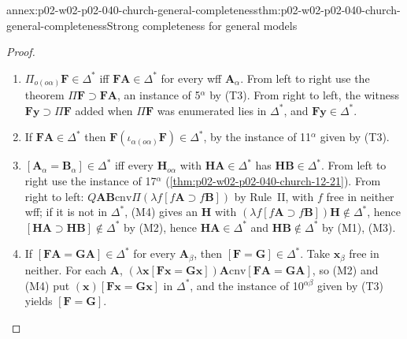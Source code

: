 \begin{annexitem}{annex:p02-w02-p02-040-church-general-completeness}{thm:p02-w02-p02-040-church-general-completeness}{Strong completeness for general models}
\begin{proof}
\begin{enumerate}
 \item[(M4)] \(\Pi_{o(o\alpha)}\mathbf F\in\Delta^*\) iff
   \(\mathbf F\mathbf A\in\Delta^*\) for every wff \(\mathbf A_\alpha\).  From left to
   right use the theorem \(\Pi\mathbf F\supset\mathbf F\mathbf A\), an instance of
   5\(^\alpha\) by (T3).  From right to left, the witness
   \(\mathbf F\mathbf y\supset\Pi\mathbf F\) added when \(\Pi\mathbf F\) was enumerated
   lies in \(\Delta^*\), and \(\mathbf F\mathbf y\in\Delta^*\).
 \item[(M5)] If \(\mathbf F\mathbf A\in\Delta^*\) then
   \(\mathbf F(\iota_{\alpha(o\alpha)}\mathbf F)\in\Delta^*\), by the instance of
   11\(^\alpha\) given by (T3).
 \item[(M6)] \([\mathbf A_\alpha=\mathbf B_\alpha]\in\Delta^*\) iff every
   \(\mathbf H_{o\alpha}\) with \(\mathbf H\mathbf A\in\Delta^*\) has
   \(\mathbf H\mathbf B\in\Delta^*\).  From left to right use the instance of
   17\(^\alpha\) (\cref{thm:p02-w02-p02-040-church-12-21}).  From right to left:
   \(Q\mathbf A\mathbf B\mathrel{\mathrm{cnv}}\Pi(\lambda f[f\mathbf A\supset f\mathbf B])\) by Rule~II,
   with \(f\) free in neither wff; if it is not in \(\Delta^*\), (M4) gives an
   \(\mathbf H\) with \((\lambda f[f\mathbf A\supset f\mathbf B])\mathbf H\notin\Delta^*\),
   hence \([\mathbf H\mathbf A\supset\mathbf H\mathbf B]\notin\Delta^*\) by (M2), hence
   \(\mathbf H\mathbf A\in\Delta^*\) and \(\mathbf H\mathbf B\notin\Delta^*\) by (M1), (M3).
 \item[(M7)] If \([\mathbf F\mathbf A=\mathbf G\mathbf A]\in\Delta^*\) for every
   \(\mathbf A_\beta\), then \([\mathbf F=\mathbf G]\in\Delta^*\).  Take \(\mathbf x_\beta\)
   free in neither.  For each \(\mathbf A\),
   \((\lambda\mathbf x[\mathbf F\mathbf x=\mathbf G\mathbf x])\mathbf A\mathrel{\mathrm{cnv}}[\mathbf F\mathbf A=\mathbf G\mathbf A]\),
   so (M2) and (M4) put \((\mathbf x)[\mathbf F\mathbf x=\mathbf G\mathbf x]\) in
   \(\Delta^*\), and the instance of 10\(^{\alpha\beta}\) given by (T3) yields
   \([\mathbf F=\mathbf G]\).
\end{enumerate}


\end{proof}
\end{annexitem}
